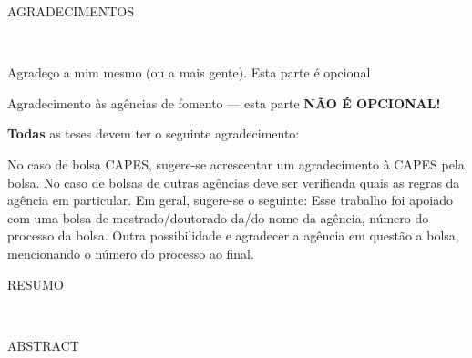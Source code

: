 {

\sffamily

{\Large \centering

  AGRADECIMENTOS

}

~\vspace{1cm}

Agradeço a mim mesmo (ou a mais gente). Esta parte é opcional


Agradecimento às agências de fomento --- esta parte \textbf{NÃO É OPCIONAL!}


\textbf{Todas} as teses devem ter o seguinte agradecimento:

\begin{center}
\end{center}

No caso de bolsa CAPES, sugere-se acrescentar um agradecimento à CAPES pela bolsa. No caso de bolsas de outras agências deve ser verificada quais as regras da agência em particular. Em geral, sugere-se o seguinte: Esse trabalho foi apoiado com uma bolsa de mestrado/doutorado da/do nome da agência, número do processo da bolsa. Outra possibilidade e agradecer a agência em questão a bolsa, mencionando o número do processo ao final.

}

\clearpage

\thispagestyle{empty}

{

	\sffamily

	{\Large	\centering

		RESUMO

	}

~\vspace{1cm}

\lipsum[1-2]

}

\clearpage

\thispagestyle{empty}

{

	\sffamily

	{\Large\centering

		ABSTRACT

	}

~\vspace{1cm}

\kant[1-2]

}
